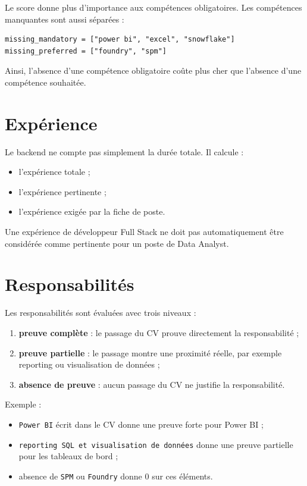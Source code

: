 \documentclass[12pt,a4paper]{report}
\begin{document}
Le score donne plus d'importance aux compétences obligatoires. Les compétences manquantes sont aussi séparées :

\begin{lstlisting}
missing_mandatory = ["power bi", "excel", "snowflake"]
missing_preferred = ["foundry", "spm"]
\end{lstlisting}

Ainsi, l'absence d'une compétence obligatoire coûte plus cher que l'absence d'une compétence souhaitée.

\section{Expérience}

Le backend ne compte pas simplement la durée totale. Il calcule :

\begin{itemize}
    \item l'expérience totale ;
    \item l'expérience pertinente ;
    \item l'expérience exigée par la fiche de poste.
\end{itemize}

Une expérience de développeur Full Stack ne doit pas automatiquement être considérée comme pertinente pour un poste de Data Analyst.

\section{Responsabilités}

Les responsabilités sont évaluées avec trois niveaux :

\begin{enumerate}
    \item \textbf{preuve complète} : le passage du CV prouve directement la responsabilité ;
    \item \textbf{preuve partielle} : le passage montre une proximité réelle, par exemple reporting ou visualisation de données ;
    \item \textbf{absence de preuve} : aucun passage du CV ne justifie la responsabilité.
\end{enumerate}

Exemple :

\begin{itemize}
    \item \texttt{Power BI} écrit dans le CV donne une preuve forte pour Power BI ;
    \item \texttt{reporting SQL et visualisation de données} donne une preuve partielle pour les tableaux de bord ;
    \item absence de \texttt{SPM} ou \texttt{Foundry} donne 0 sur ces éléments.
\end{itemize}
\end{document}
